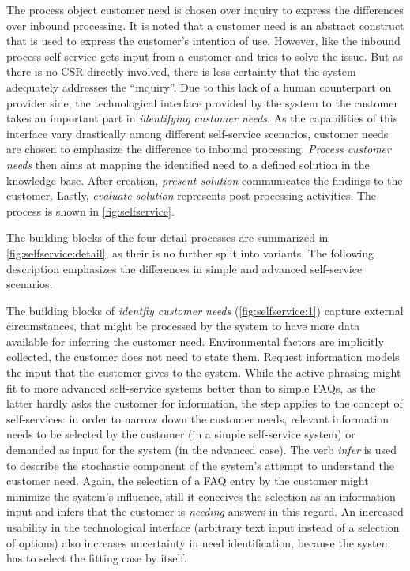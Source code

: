 	 The process object customer need is chosen over inquiry to express the differences over inbound processing. It is noted that a customer need is an abstract construct that is used to express the customer's intention of use. However, like the inbound process self-service gets input from a customer and tries to solve the issue. But as there is no \acrshort{CSR} directly involved, there is less certainty that the system adequately addresses the \enquote{inquiry}. Due to this lack of a human counterpart on provider side, the technological interface provided by the system to the customer takes an important part in \textit{identifying customer needs}. As the capabilities of this interface vary drastically among different self-service scenarios, customer needs are chosen to emphasize the difference to inbound processing. \textit{Process customer needs} then aims at mapping the identified need to a defined solution in the knowledge base. After creation, \textit{present solution} communicates the findings to the customer. Lastly, \textit{evaluate solution} represents post-processing activities. The process is shown in \Fig \ref{fig:selfservice}.
	 
	 The building blocks of the four detail processes are summarized in \Fig \ref{fig:selfservice:detail}, as their is no further split into variants. The following description emphasizes the differences in simple and advanced self-service scenarios. 
	 
	 The building blocks of \textit{identfiy customer needs} (\Fig \ref{fig:selfservice:1}) capture external circumstances, that might be processed by the system to have more data available for inferring the customer need. Environmental factors are implicitly collected, \ie the customer does not need to state them. Request information models the input that the customer gives to the system. While the active phrasing might fit to more advanced self-service systems better than to simple \acrshort{FAQ}s, as the latter hardly asks the customer for information, the step applies to the concept of self-services: in order to narrow down the customer needs, relevant information needs to be selected by the customer (in a simple self-service system) or demanded as input for the system (in the advanced case). The verb \textit{infer} is used to describe the stochastic component of the system's attempt to understand the customer need. Again, the selection of a \acrshort{FAQ} entry by the customer might minimize the system's influence, still it conceives the selection as an information input and infers that the customer is \textit{needing} answers in this regard. An increased usability in the technological interface (arbitrary text input instead of a selection of options) also increases uncertainty in need identification, because the system has to select the fitting case by itself. 
	 
